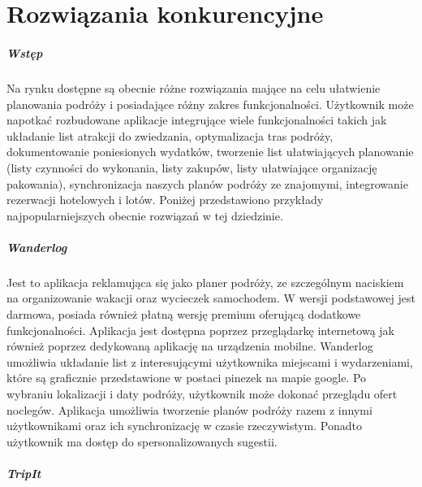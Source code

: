 \chapter{Rozwiązania konkurencyjne}
\label{ch:rozwiązania-konkurencyjne}

\paragraph{Wstęp}

Na rynku dostępne są obecnie różne rozwiązania mające na celu ułatwienie planowania podróży i posiadające różny zakres 
funkcjonalności. Użytkownik może napotkać rozbudowane aplikacje integrujące wiele funkcjonalności takich jak układanie list 
atrakcji do zwiedzania, optymalizacja tras podróży, dokumentowanie poniesionych wydatków, tworzenie list ułatwiających planowanie 
(listy czynności do wykonania, listy zakupów, listy ułatwiające organizację pakowania), synchronizacja naszych planów podróży 
ze znajomymi, integrowanie rezerwacji hotelowych i lotów. Poniżej przedstawiono przykłady najpopularniejszych obecnie rozwiązań 
w tej dziedzinie.

\paragraph{Wanderlog}

Jest to aplikacja reklamująca się jako planer podróży, ze szczególnym naciskiem na organizowanie wakacji oraz wycieczek samochodem.
W wersji podstawowej jest darmowa, posiada również płatną wersję premium  oferującą dodatkowe funkcjonalności.
Aplikacja jest dostępna poprzez przeglądarkę internetową jak również poprzez dedykowaną aplikację na urządzenia mobilne. 
Wanderlog umożliwia układanie list z interesującymi użytkownika miejscami i wydarzeniami, które są graficznie przedstawione w
postaci pinezek na mapie google. Po wybraniu lokalizacji i daty podróży, użytkownik może dokonać przeglądu ofert noclegów. 
Aplikacja umożliwia tworzenie planów podróży razem z innymi użytkownikami oraz ich synchronizację w czasie rzeczywistym. 
Ponadto użytkownik ma dostęp do spersonalizowanych sugestii.

\paragraph{TripIt}

